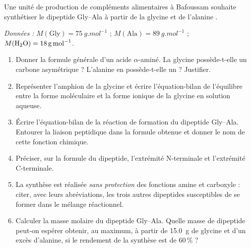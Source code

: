 \documentclass[11pt]{article}
\newcounter{popsec}
\newcounter{popsub}
\newcommand{\courssub}[1]{%
  \stepcounter{popsub}%
  \par\vspace{9pt}\noindent{\popxbold\fontsize{11.5}{13}\selectfont\color{popink}{\color{poporange}\thepopsec.\thepopsub}\hspace{6pt}#1}\par\nopagebreak\vspace{4pt}
}
\begin{document}
\courssub{Je me prépare au Bac}

\begin{exercice}
Une unité de production de compléments alimentaires à Bafoussam souhaite synthétiser le dipeptide Gly--Ala à partir de la glycine  et de l'alanine .

\emph{Données :} $M(\text{Gly}) = \SI{75}{g.mol^{-1}}$ ; $M(\text{Ala}) = \SI{89}{g.mol^{-1}}$ ; $M(\ce{H2O}) = \SI{18}{g.mol^{-1}}$.
\begin{enumerate}
\item Donner la formule générale d'un acide $\alpha$-aminé. La glycine possède-t-elle un carbone asymétrique ? L'alanine en possède-t-elle un ? Justifier.
\item Représenter l'amphion de la glycine et écrire l'équation-bilan de l'équilibre entre la forme moléculaire et la forme ionique de la glycine en solution aqueuse.
\item Écrire l'équation-bilan de la réaction de formation du dipeptide Gly--Ala. Entourer la liaison peptidique dans la formule obtenue et donner le nom de cette fonction chimique.
\item Préciser, sur la formule du dipeptide, l'extrémité N-terminale et l'extrémité C-terminale.
\item La synthèse est réalisée \emph{sans protection} des fonctions amine et carboxyle : citer, avec leurs abréviations, les trois autres dipeptides susceptibles de se former dans le mélange réactionnel.
\item Calculer la masse molaire du dipeptide Gly--Ala. Quelle masse de dipeptide peut-on espérer obtenir, au maximum, à partir de \SI{15,0}{g} de glycine et d'un excès d'alanine, si le rendement de la synthèse est de $60\,\%$ ?
\end{enumerate}
\end{exercice}
\end{document}
